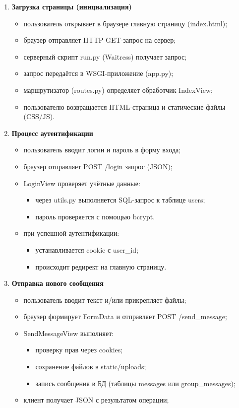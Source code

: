 \begin{enumerate}[leftmargin=*,label=\textbf{\arabic*.}]
	\item \textbf{Загрузка страницы (инициализация)}
	\begin{itemize}
		\item пользователь открывает в браузере главную страницу (index.html);
		\item браузер отправляет HTTP GET-запрос на сервер;
		\item серверный скрипт run.py (Waitress) получает запрос;
		\item запрос передаётся в WSGI-приложение (app.py);
		\item маршрутизатор (routes.py) определяет обработчик IndexView;
		\item пользователю возвращается HTML-страница и статические файлы (CSS/JS).
	\end{itemize}
	
	\item \textbf{Процесс аутентификации}
	\begin{itemize}
		\item пользователь вводит логин и пароль в форму входа;
		\item браузер отправляет POST /login запрос (JSON);
		\item LoginView проверяет учётные данные:
		\begin{itemize}
			\item через utils.py выполняется SQL-запрос к таблице users;
			\item пароль проверяется с помощью bcrypt.
		\end{itemize}
		\item при успешной аутентификации:
		\begin{itemize}
			\item устанавливается cookie с user\_id;
			\item происходит редирект на главную страницу.
		\end{itemize}
	\end{itemize}
	
	\item \textbf{Отправка нового сообщения}
	\begin{itemize}
		\item пользователь вводит текст и/или прикрепляет файлы;
		\item браузер формирует FormData и отправляет POST /send\_message;
		\item SendMessageView выполняет:
		\begin{itemize}
			\item проверку прав через cookies;
			\item сохранение файлов в static/uploads;
			\item запись сообщения в БД (таблицы messages или group\_messages);
		\end{itemize}
		\item клиент получает JSON с результатом операции;
	\end{itemize}
	

\end{enumerate}
